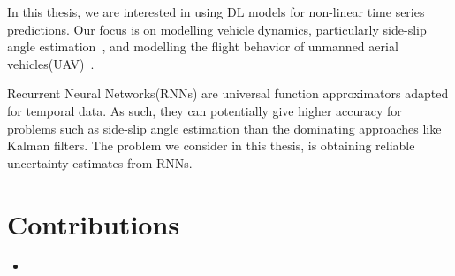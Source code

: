 \documentclass[../main.tex]{subfiles}
\begin{document}
In this thesis, we are interested in using DL models for non-linear time series predictions. Our focus is on modelling vehicle dynamics, particularly side-slip angle estimation~\citep{graber2018hybrid}, and modelling the flight behavior of unmanned aerial vehicles(UAV)~\citep{antonini2018blackbird}.

Recurrent Neural Networks(RNNs) are universal function approximators adapted for temporal data. As such, they can potentially give higher accuracy for problems such as side-slip angle estimation than the dominating approaches like Kalman filters\citep{graber2018hybrid}. 
The problem we consider in this thesis, is obtaining reliable uncertainty estimates from RNNs.

\section{Contributions}

\begin{itemize}
    \item 
\end{itemize}{}
\end{document}
